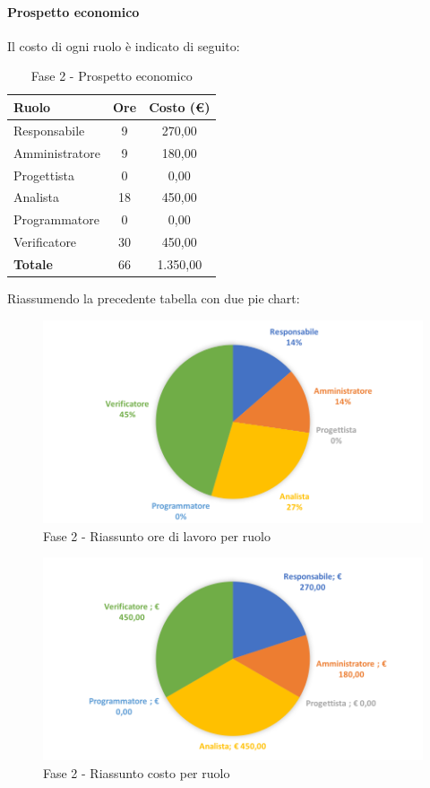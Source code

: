 \documentclass[../PianoDiProgetto.tex]{subfiles}
\begin{document}
			\newpage
			\paragraph{Prospetto economico}
			Il costo di ogni ruolo è indicato di seguito:
			\begin{table}[h]
				\centering
				\begin{tabular}{l * {2}{c}}
				\toprule
				\textbf{Ruolo} & \textbf{Ore} & \textbf{Costo (\euro{})} \\
				\midrule
				Responsabile & 9 & 270,00 \\
				Amministratore & 9 & 180,00 \\
				Progettista & 0 & 0,00 \\
				Analista & 18 & 450,00 \\		
				Programmatore & 0 & 0,00 \\		
				Verificatore & 30 & 450,00 \\				
				\midrule		
				\textbf{Totale} & 66 & 1.350,00 \\
				\bottomrule	
				\end{tabular}
				\caption{Fase 2 - Prospetto economico}		
			\end{table}
			
			Riassumendo la precedente tabella con due pie chart:	
			\begin{figure}[!h]
				\centering
				\includegraphics[width=\textwidth]{Preventivo/Immagini/fase2_oreRuolo.png}
				\caption{Fase 2 - Riassunto ore di lavoro per ruolo}
			\end{figure}	
			\newpage
			\begin{figure}[!h]
				\centering
				\includegraphics[width=\textwidth]{Preventivo/Immagini/fase2_costoRuolo.png}
				\caption{Fase 2 - Riassunto costo per ruolo}
			\end{figure}	
			
\end{document}
